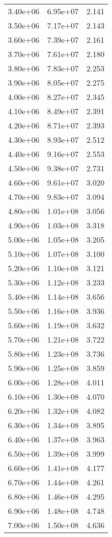 \begin{table}
\begin{tabular}{lll}
3.40e+06 & 6.95e+07 & 2.141 \\
3.50e+06 & 7.17e+07 & 2.143 \\
3.60e+06 & 7.39e+07 & 2.161 \\
3.70e+06 & 7.61e+07 & 2.180 \\
3.80e+06 & 7.83e+07 & 2.253 \\
3.90e+06 & 8.05e+07 & 2.275 \\
4.00e+06 & 8.27e+07 & 2.345 \\
4.10e+06 & 8.49e+07 & 2.391 \\
4.20e+06 & 8.71e+07 & 2.393 \\
4.30e+06 & 8.93e+07 & 2.512 \\
4.40e+06 & 9.16e+07 & 2.553 \\
4.50e+06 & 9.38e+07 & 2.731 \\
4.60e+06 & 9.61e+07 & 3.020 \\
4.70e+06 & 9.83e+07 & 3.094 \\
4.80e+06 & 1.01e+08 & 3.056 \\
4.90e+06 & 1.03e+08 & 3.318 \\
5.00e+06 & 1.05e+08 & 3.205 \\
5.10e+06 & 1.07e+08 & 3.100 \\
5.20e+06 & 1.10e+08 & 3.121 \\
5.30e+06 & 1.12e+08 & 3.233 \\
5.40e+06 & 1.14e+08 & 3.656 \\
5.50e+06 & 1.16e+08 & 3.936 \\
5.60e+06 & 1.19e+08 & 3.632 \\
5.70e+06 & 1.21e+08 & 3.722 \\
5.80e+06 & 1.23e+08 & 3.736 \\
5.90e+06 & 1.25e+08 & 3.859 \\
6.00e+06 & 1.28e+08 & 4.011 \\
6.10e+06 & 1.30e+08 & 4.070 \\
6.20e+06 & 1.32e+08 & 4.082 \\
6.30e+06 & 1.34e+08 & 3.895 \\
6.40e+06 & 1.37e+08 & 3.963 \\
6.50e+06 & 1.39e+08 & 3.999 \\
6.60e+06 & 1.41e+08 & 4.177 \\
6.70e+06 & 1.44e+08 & 4.261 \\
6.80e+06 & 1.46e+08 & 4.295 \\
6.90e+06 & 1.48e+08 & 4.748 \\
7.00e+06 & 1.50e+08 & 4.636 \\

\end{tabular}
\end{table}
